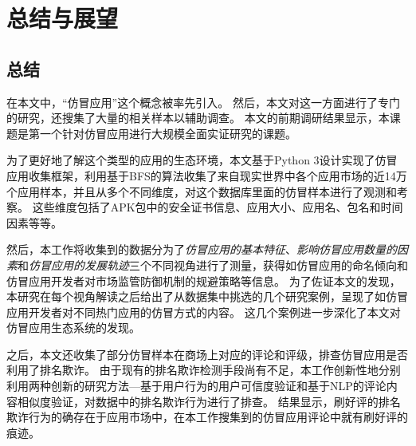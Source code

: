 \chapter{总结与展望}
\label{chp:future}

\section{总结}
在本文中，``仿冒应用''这个概念被率先引入。
然后，本文对这一方面进行了专门的研究，还搜集了大量的相关样本以辅助调查。
本文的前期调研结果显示，本课题是第一个针对仿冒应用进行大规模全面实证研究的课题。

为了更好地了解这个类型的应用的生态环境，本文基于Python 3设计实现了仿冒应用收集框架\mytool，利用基于BFS的算法收集了来自现实世界中各个应用市场的近14万个应用样本，并且从多个不同维度，对这个数据库里面的仿冒样本进行了观测和考察。
这些维度包括了APK包中的安全证书信息、应用大小、应用名、包名和时间因素等等。

然后，本工作将收集到的数据分为了\emph{仿冒应用的基本特征}、\emph{影响仿冒应用数量的因素}和\emph{仿冒应用的发展轨迹}三个不同视角进行了测量，获得如仿冒应用的命名倾向和仿冒应用开发者对市场监管防御机制的规避策略等信息。
为了佐证本文的发现，本研究在每个视角解读之后给出了从数据集中挑选的几个研究案例，呈现了如仿冒应用开发者对不同热门应用的仿冒方式的内容。
这几个案例进一步深化了本文对仿冒应用生态系统的发现。

之后，本文还收集了部分仿冒样本在商场上对应的评论和评级，排查仿冒应用是否利用了排名欺诈。
由于现有的排名欺诈检测手段尚有不足，本工作创新性地分别利用两种创新的研究方法---基于用户行为的用户可信度验证和基于NLP的评论内容相似度验证，对数据中的排名欺诈行为进行了排查。
结果显示，刷好评的排名欺诈行为的确存在于应用市场中，在本工作搜集到的仿冒应用评论中就有刷好评的痕迹。


